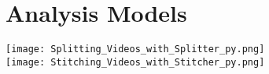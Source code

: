 \section{Analysis Models}
\texttt{[image: Splitting\_Videos\_with\_Splitter\_py.png]}
\\
\texttt{[image: Stitching\_Videos\_with\_Stitcher\_py.png]}

